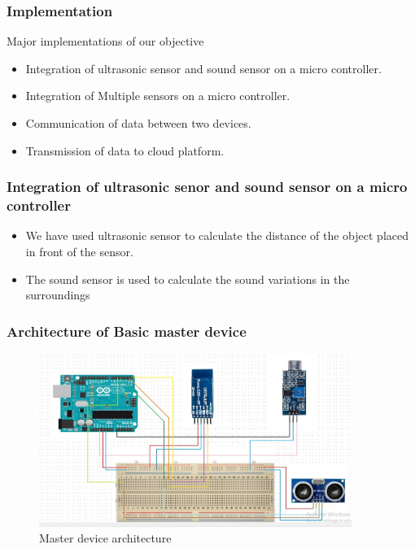 \documentclass{beamer}
\begin{document}
\begin{frame}\frametitle{Implementation}
\item Major implementations of our objective 
\begin{itemize}

\item Integration of ultrasonic sensor and sound sensor on a micro controller.
\item Integration of Multiple sensors on a micro controller.
\item Communication of data between two devices.
\item Transmission of data to cloud platform.

\end{itemize}
\end{frame}
\begin{frame}\frametitle{Integration of ultrasonic senor and sound sensor on a micro controller}
\begin{itemize}
\item We have used ultrasonic sensor to calculate the distance of the object placed in front of the sensor.
\item The sound sensor is used to calculate the  sound variations in the  surroundings
\end{itemize}
\end{frame}
\begin{frame}\frametitle{Architecture of Basic master device}
\begin{itemize}
  \begin{figure}[H]
  \centerline{\includegraphics[width=4.0in]{master.JPG}}
  \caption{ \textbf{}Master device architecture}
  \end{figure}
\end{itemize}
\end{frame}
\end{document}

